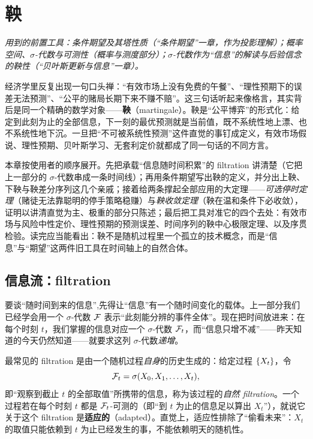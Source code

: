 \chapter{鞅}
\label{ch:martingale}

\noindent\emph{用到的前置工具：条件期望及其塔性质（``条件期望''一章，作为投影理解）；概率空间、$\sigma$-代数与可测性（概率与测度部分）；$\sigma$-代数作为``信息''的解读与后验信念的鞅性（``贝叶斯更新与信息''一章）。}
\medskip

经济学里反复出现一句口头禅：``有效市场上没有免费的午餐''、``理性预期下的误差无法预测''、``公平的赌局长期下来不赚不赔''。这三句话听起来像格言，其实背后是同一个精确的数学对象——\textbf{鞅}（martingale）。鞅是``公平博弈''的形式化：给定到此刻为止的全部信息，下一刻的最优预测就是当前值，既不系统性地上漂、也不系统性地下沉。一旦把``不可被系统性预测''这件直觉的事钉成定义，有效市场假说、理性预期、贝叶斯学习、无套利定价就都成了同一句话的不同方言。

本章按使用者的顺序展开。先把承载``信息随时间积累''的 filtration 讲清楚（它把上一部分的 $\sigma$-代数串成一条时间线）；再用条件期望写出鞅的定义，并分出上鞅、下鞅与鞅差分序列这几个亲戚；接着给两条撑起全部应用的大定理——\emph{可选停时定理}（赌徒无法靠聪明的停手策略稳赚）与\emph{鞅收敛定理}（鞅在温和条件下必收敛），证明以讲清直觉为主、极重的部分只陈述；最后把工具对准它的四个去处：有效市场与风险中性定价、理性预期的预测误差、时间序列的鞅中心极限定理、以及序贯检验。读完应当能看出：鞅不是随机过程里一个孤立的技术概念，而是``信息''与``期望''这两件旧工具在时间轴上的自然合体。

\section{信息流：filtration}
\label{sec:martingale-filtration}

要谈``随时间到来的信息'',先得让``信息''有一个随时间变化的载体。上一部分我们已经学会用一个 $\sigma$-代数 $\mathcal{F}$ 表示``此刻能分辨的事件全体''。现在把时间放进来：在每个时刻 $t$，我们掌握的信息对应一个 $\sigma$-代数 $\mathcal{F}_t$，而``信息只增不减''——昨天知道的今天仍然知道——就要求这列 $\sigma$-代数\emph{递增}。


最常见的 filtration 是由一个随机过程\emph{自身}的历史生成的：给定过程 $\left\{X_t\right\}$，令
\[
    \mathcal{F}_t=\sigma(X_0,X_1,\dots,X_t),
\]
即``观察到截止 $t$ 的全部取值''所携带的信息，称为该过程的\emph{自然 filtration}。一个过程若在每个时刻 $t$ 都是 $\mathcal{F}_t$-可测的（即``到 $t$ 为止的信息足以算出 $X_t$''），就说它关于这个 filtration 是\textbf{适应的}（adapted）。直觉上，适应性排除了``偷看未来''：$X_t$ 的取值只能依赖到 $t$ 为止已经发生的事，不能依赖明天的随机性。

